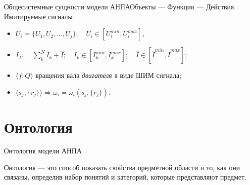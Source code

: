 \begin{frame}{Общесистемные сущности модели АНПА}{Объекты --- Функции --- Действия. Имитируемые сигналы}
\begin{enumerate}
        \begin{itemize}
            \item<4->[Напряжения] $U_i = \{U_1, U_2, \ldots, U_j\};\quad U_i \in [U_i^{min}, U_i^{max}]$,
            \item<4->[Токи] $I_\Sigma = \sum_k^N I_k + \hat I;\quad I_k \in [I_k^{min}, I_k^{max}];\quad \hat I \in [\hat I^{min}, \hat I^{max}]$;
            \item<5->[СУД] $\langle f; Q \rangle$ вращения вала \textit{двигателя} в виде ШИМ сигнала;
            \item<6->[Руление] $\langle s_j, \{r_j\} \rangle \Rightarrow \omega_i = \omega_i(s_j, \{r_j\})$.
        \end{itemize}    
    \end{enumerate}
\end{frame}






\section{Онтология}
\begin{frame}{Онтология модели АНПА}{\protege}
    \begin{center}

        {\huge Онтология} --- это способ показать свойства предметной области и то, как они связаны,
            определив набор понятий и категорий, которые представляют предмет.
    \end{center}
\end{frame}






